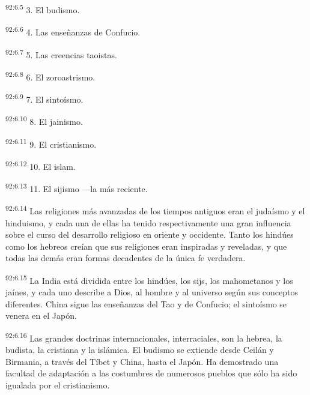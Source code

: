 \par
\textsuperscript{92:6.5} 3. El budismo.

\par
\textsuperscript{92:6.6} 4. Las enseñanzas de Confucio.

\par
\textsuperscript{92:6.7} 5. Las creencias taoistas.

\par
\textsuperscript{92:6.8} 6. El zoroastrismo.

\par
\textsuperscript{92:6.9} 7. El sintoísmo.

\par
\textsuperscript{92:6.10} 8. El jainismo.

\par
\textsuperscript{92:6.11} 9. El cristianismo.

\par
\textsuperscript{92:6.12} 10. El islam.

\par
\textsuperscript{92:6.13} 11. El sijismo ---la más reciente.

\par
\textsuperscript{92:6.14} Las religiones más avanzadas de los tiempos antiguos eran el judaísmo y el hinduismo, y cada una de ellas ha tenido respectivamente una gran influencia sobre el curso del desarrollo religioso en oriente y occidente. Tanto los hindúes como los hebreos creían que sus religiones eran inspiradas y reveladas, y que todas las demás eran formas decadentes de la única fe verdadera.

\par
\textsuperscript{92:6.15} La India está dividida entre los hindúes, los sijs, los mahometanos y los jaínes, y cada uno describe a Dios, al hombre y al universo según sus conceptos diferentes. China sigue las enseñanzas del Tao y de Confucio; el sintoísmo se venera en el Japón.

\par
\textsuperscript{92:6.16} Las grandes doctrinas internacionales, interraciales, son la hebrea, la budista, la cristiana y la islámica. El budismo se extiende desde Ceilán y Birmania, a través del Tíbet y China, hasta el Japón. Ha demostrado una facultad de adaptación a las costumbres de numerosos pueblos que sólo ha sido igualada por el cristianismo.

